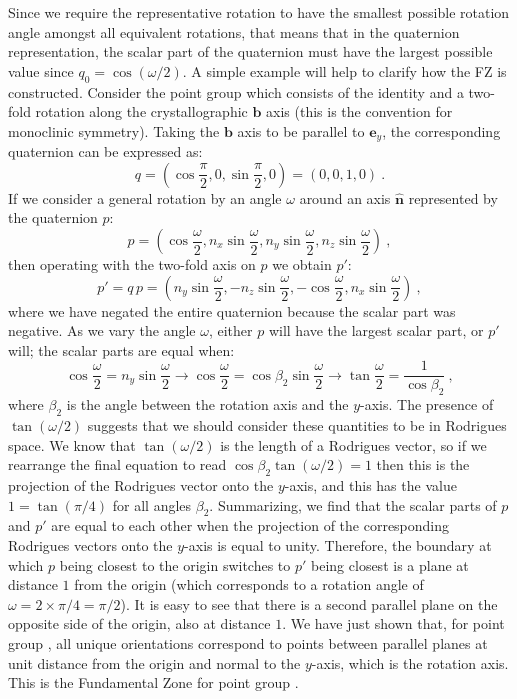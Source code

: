 Since we require the representative rotation to have the smallest possible rotation angle amongst all equivalent rotations, that means that in the quaternion representation, the scalar part of the quaternion must have the largest possible value since $q_0=\cos(\omega/2)$.   A simple example will help to clarify how the FZ is constructed.  Consider the point group  which consists of the identity and a two-fold rotation along the crystallographic $\mathbf{b}$ axis (this is the convention for monoclinic symmetry).  Taking the $\mathbf{b}$ axis to be parallel to $\mathbf{e}_y$, the corresponding quaternion can be expressed as:
\[
	q = \left(\cos\frac{\pi}{2},0,\sin\frac{\pi}{2},0\right) = \left(0,0,1,0\right)\ .
\]
If we consider a general rotation by an angle $\omega$ around an axis $\hat{\mathbf{n}}$ represented by the quaternion $p$:
\[
	p = \left(\cos\frac{\omega}{2},n_x\sin\frac{\omega}{2},n_y\sin\frac{\omega}{2},n_z\sin\frac{\omega}{2}\right)\ ,
\]
then operating with the two-fold axis on $p$ we obtain $p'$:
\[
	p' = q\,p = \left(n_y\sin\frac{\omega}{2},-n_z\sin\frac{\omega}{2},-\cos\frac{\omega}{2},n_x\sin\frac{\omega}{2}\right)\ ,
\]
where we have negated the entire quaternion because the scalar part was negative. As we vary the angle $\omega$, either $p$ will have the largest scalar part, or $p'$ will; the scalar parts are equal when:
\[
	\cos\frac{\omega}{2} = n_y\sin\frac{\omega}{2}\rightarrow \cos\frac{\omega}{2} = \cos\beta_2\sin\frac{\omega}{2}
	\rightarrow \tan\frac{\omega}{2}=\frac{1}{\cos\beta_2}\ ,
\]
where $\beta_2$ is the angle between the rotation axis and the $y$-axis.  The presence of $\tan(\omega/2)$ suggests that we should consider these quantities to be in Rodrigues space.  We know that $\tan(\omega/2)$ is the length of a Rodrigues vector, so if we rearrange the final equation to read $\cos\beta_2 \tan(\omega/2) = 1$ then this is the projection of the Rodrigues vector onto the $y$-axis, and this has the value $1=\tan(\pi/4)$ for all angles $\beta_2$.  Summarizing, we find that the scalar parts of $p$ and $p'$ are equal to each other when the projection of the corresponding Rodrigues vectors onto the $y$-axis is equal to unity. Therefore, the boundary at which $p$ being closest to the origin switches to $p'$ being closest is a plane at distance $1$ from the origin (which corresponds to a rotation angle of $\omega=2\times \pi/4=\pi/2$).  It is easy to see that there is a second parallel plane on the opposite side of the origin, also at distance $1$.  We have just shown that, for point group , all unique orientations correspond to points between parallel planes at unit distance from the origin and normal to the $y$-axis, which is the rotation axis.  This is the Fundamental Zone for point group .

